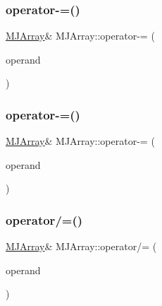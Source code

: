 \hypertarget{classMJArray_ab776bc1d3b6d080f74e9d38c0a8e274e}{}\label{classMJArray_ab776bc1d3b6d080f74e9d38c0a8e274e} 
\subsubsection{\texorpdfstring{operator-\/=()}{operator-=()}\hspace{0.1cm}{\footnotesize\ttfamily [1/2]}}
{\footnotesize\ttfamily \hyperlink{classMJArray}{M\+J\+Array}\& M\+J\+Array\+::operator-\/= (\begin{DoxyParamCaption}\item[{const \hyperlink{classMJArray}{M\+J\+Array} \&}]{operand }\end{DoxyParamCaption})}

\hypertarget{classMJArray_afd06295917fc094dea817bf83222d3d1}{}\label{classMJArray_afd06295917fc094dea817bf83222d3d1} 
\subsubsection{\texorpdfstring{operator-\/=()}{operator-=()}\hspace{0.1cm}{\footnotesize\ttfamily [2/2]}}
{\footnotesize\ttfamily \hyperlink{classMJArray}{M\+J\+Array}\& M\+J\+Array\+::operator-\/= (\begin{DoxyParamCaption}\item[{const double \&}]{operand }\end{DoxyParamCaption})}

\hypertarget{classMJArray_ae376c7745492b26cd040412fd4599a2e}{}\label{classMJArray_ae376c7745492b26cd040412fd4599a2e} 
\subsubsection{\texorpdfstring{operator/=()}{operator/=()}\hspace{0.1cm}{\footnotesize\ttfamily [1/2]}}
{\footnotesize\ttfamily \hyperlink{classMJArray}{M\+J\+Array}\& M\+J\+Array\+::operator/= (\begin{DoxyParamCaption}\item[{const \hyperlink{classMJArray}{M\+J\+Array} \&}]{operand }\end{DoxyParamCaption})}

